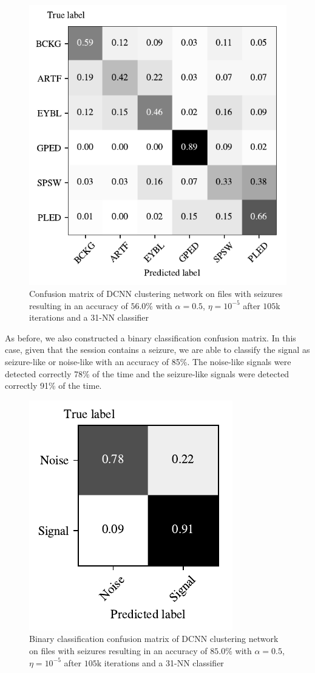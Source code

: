 \begin{figure}[!ht]
	\centering
	\includegraphics[width=0.7\linewidth]{pictures/conf_mat_exp_with_seizure.pdf}
	\caption[Confusion matrix on sessions with seizure-like signals]{Confusion matrix of DCNN clustering network on files with seizures resulting in an accuracy of $56.0\%$ with $\alpha = 0.5$, $\eta = 10^{-5}$ after $105$k iterations and a 31-NN classifier}\label{fig:conf_mat_exp_with_seizure}  
\end{figure}

As before, we also constructed a binary classification confusion matrix. In this case, given that the session contains a seizure, we are able to classify the signal as seizure-like or noise-like with an accuracy of 85\%. The noise-like signals were detected correctly 78\% of the time and the seizure-like signals were detected correctly 91\% of the time. 


\begin{figure}[!ht]
	\centering
	\includegraphics[width=0.425\linewidth]{pictures/conf_mat_exp_with_seizure_pooled.pdf}
	\caption[Binary confusion matrix on sessions with seizure-like signals]{Binary classification confusion matrix of DCNN clustering network on files with seizures resulting in an accuracy of $85.0\%$ with $\alpha = 0.5$, $\eta = 10^{-5}$ after $105$k iterations and a 31-NN classifier}\label{fig:conf_mat_exp_with_seizure_pooled}  
\end{figure}

